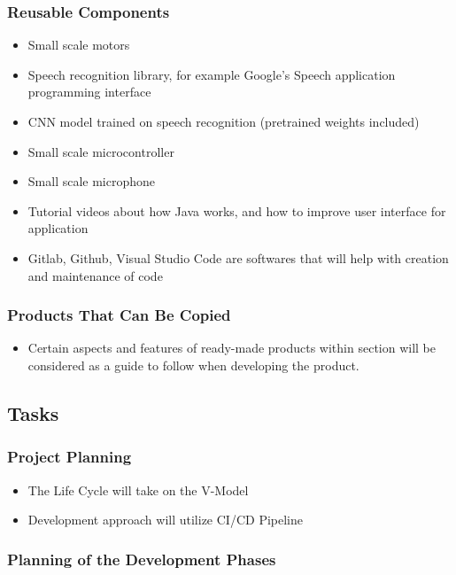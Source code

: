 \documentclass[12pt]{article}
\begin{document}
\subsubsection{Reusable Components}
\begin{itemize}
  \item Small scale motors
  \item Speech recognition library, for example Google’s Speech application programming interface
  \item CNN model trained on speech recognition (pretrained weights included) 
  \item Small scale microcontroller
  \item Small scale microphone
  \item Tutorial videos about how Java works, and how to improve user interface for application
  \item Gitlab, Github, Visual Studio Code are softwares that will help with creation and maintenance of code
\end{itemize}
\subsubsection{Products That Can Be Copied}
\begin{itemize}
  \item Certain aspects and features of ready-made products within section  will be considered as a guide to follow when developing the product.
\end{itemize}
\subsection{Tasks}

\subsubsection{Project Planning}

\begin{itemize}
  \item The Life Cycle will take on the V-Model
  \item Development approach will utilize CI/CD Pipeline
\end{itemize}

\subsubsection{Planning of the Development Phases}
\end{document}
